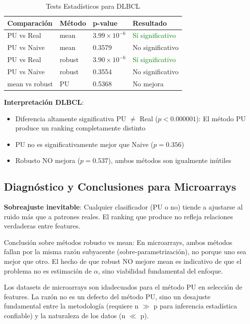 \documentclass[a4paper,11pt]{article}
\begin{document}
\begin{table}[H]
\centering
\caption{Tests Estadísticos para DLBCL}
\begin{tabular}{llll}
\toprule
Comparación & Método & p-value & Resultado \\
\midrule
PU vs Real & mean & $3.99 \times 10^{-6}$ & \textcolor{green}{Sí significativo} \\
PU vs Naive & mean & 0.3579 & {No significativo} \\
PU vs Real & robust & $3.90 \times 10^{-6}$ & \textcolor{green}{Sí significativo} \\
PU vs Naive & robust & 0.3554 & {No significativo} \\
mean vs robust & PU & 0.5368 & {No mejora} \\
\bottomrule
\end{tabular}
\end{table}

\textbf{Interpretación DLBCL}:
\begin{itemize}
    \item {Diferencia altamente significativa PU $\neq$ Real} ($p < 0.000001$): El método PU produce un ranking completamente distinto
    \item PU no es significativamente mejor que Naive ($p=0.356$)
    \item {Robusto NO mejora} ($p=0.537$), ambos métodos son igualmente inútiles
\end{itemize}

\subsection{Diagnóstico y Conclusiones para Microarrays}

\textbf{Sobreajuste inevitable}: Cualquier clasificador (PU o no) tiende a ajustarse al ruido más que a patrones reales. El ranking que produce no refleja relaciones verdaderas entre features.

{Conclusión sobre métodos robusto vs mean:} En microarrays, ambos métodos fallan por la misma razón subyacente (sobre-parametrización), no porque uno sea mejor que otro. El hecho de que robust NO mejore mean es indicativo de que el problema no es estimación de $\alpha$, sino viabilidad fundamental del enfoque.

Los datasets de microarrays son idadecuados para el método PU en selección de features. La razón no es un defecto del método PU, sino un desajuste fundamental entre la metodología (requiere n $\gg$ p para inferencia estadística confiable) y la naturaleza de los datos (n $\ll$ p). 
\end{document}
